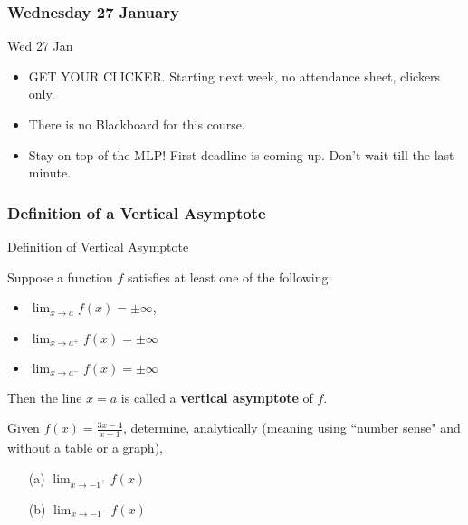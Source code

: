\documentclass[cal1spr16Lectures.tex]{subfiles}
\begin{document}

\subsubsection{\bf Wednesday 27 January}
\begin{frame}[allowframebreaks]{Wed 27 Jan}
\begin{itemize}\footnotesize
\item GET YOUR CLICKER.  Starting next week, no attendance sheet, clickers only.	
\item There is no Blackboard for this course.
\item Stay on top of the MLP!  First deadline is coming up.  Don't wait till the last minute.
\end{itemize}
\end{frame}

\subsubsection{Definition of a Vertical Asymptote}
\begin{frame}{\small Definition of Vertical Asymptote}
\begin{dfn} Suppose a function $f$ satisfies at least one of the following: 

\begin{itemize}
\item $\displaystyle\lim_{x \to a} f(x) = \pm\infty$,
\item $\displaystyle\lim_{x \to a^+} f(x) = \pm\infty$
\item $\displaystyle\lim_{x \to a^-} f(x) = \pm\infty$
\end{itemize}

Then the line $x=a$ is called a {\bf vertical asymptote} of $f$. \end{dfn}
\end{frame}

\begin{frame}
\begin{exe} Given $f(x)=\frac{3x-4}{x+1}$, determine, analytically (\alert{meaning using ``number sense" and without a table or a graph}), 

\begin{itemize}
\item[(a)\;] $\displaystyle\lim_{x \to -1^+} f(x)$ 
\item[(b)\;] $\displaystyle\lim_{x \to -1^-} f(x)$
\end{itemize}
\end{exe}
\end{frame}
\end{document}
